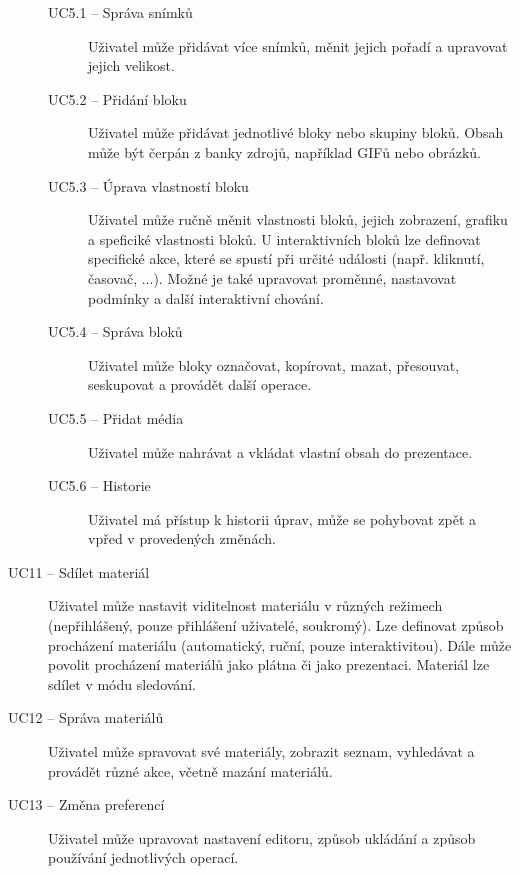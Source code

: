 \begin{description}
        \begin{description}
            \item[UC5.1 -- Správa snímků]
            Uživatel může přidávat více snímků, měnit jejich pořadí a upravovat jejich velikost.
            
            \item[UC5.2 -- Přidání bloku]
            Uživatel může přidávat jednotlivé bloky nebo skupiny bloků. Obsah může být čerpán z banky zdrojů, například GIFů nebo obrázků.
            
            \item[UC5.3 -- Úprava vlastností bloku]
            Uživatel může ručně měnit vlastnosti bloků, jejich zobrazení, grafiku a speficiké vlastnosti bloků. U interaktivních bloků lze definovat specifické akce, které se spustí při určité události (např. kliknutí, časovač, ...). Možné je také upravovat proměnné, nastavovat podmínky a další interaktivní chování.
            
            \item[UC5.4 -- Správa bloků]
            Uživatel může bloky označovat, kopírovat, mazat, přesouvat, seskupovat a provádět další operace.
            
            \item[UC5.5 -- Přidat média]
            Uživatel může nahrávat a vkládat vlastní obsah do prezentace.
            
            \item[UC5.6 -- Historie]
            Uživatel má přístup k historii úprav, může se pohybovat zpět a vpřed v provedených změnách.
        \end{description}
    
    \item[UC11 -- Sdílet materiál]
    Uživatel může nastavit viditelnost materiálu v různých režimech (nepřihlášený, pouze přihlášení uživatelé, soukromý). Lze definovat způsob procházení materiálu (automatický, ruční, pouze interaktivitou). Dále může povolit procházení materiálů jako plátna či jako prezentaci. Materiál lze sdílet v módu sledování.
    
    \item[UC12 -- Správa materiálů]
    Uživatel může spravovat své materiály, zobrazit seznam, vyhledávat a provádět různé akce, včetně mazání materiálů.
    
    \item[UC13 -- Změna preferencí]
    Uživatel může upravovat nastavení editoru, způsob ukládání a způsob používání jednotlivých operací.


\end{description}

